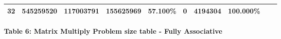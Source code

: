 \documentclass[11pt]{article}
\begin{document}
\begin{longtable}[]{@{}llllllllll@{}}
\begin{minipage}[t]{0.09\columnwidth}
32\strut
\end{minipage} & \begin{minipage}[t]{0.07\columnwidth}\raggedright\strut
545259520\strut
\end{minipage} & \begin{minipage}[t]{0.06\columnwidth}\raggedright\strut
117003791\strut
\end{minipage} & \begin{minipage}[t]{0.07\columnwidth}\raggedright\strut
155625969\strut
\end{minipage} & \begin{minipage}[t]{0.07\columnwidth}\raggedright\strut
57.100\%\strut
\end{minipage} & \begin{minipage}[t]{0.06\columnwidth}\raggedright\strut
0\strut
\end{minipage} & \begin{minipage}[t]{0.07\columnwidth}\raggedright\strut
4194304\strut
\end{minipage} & \begin{minipage}[t]{0.07\columnwidth}\raggedright\strut
100.000\%\strut
\end{minipage}\tabularnewline
\bottomrule
\end{longtable}

\paragraph{Table 6: Matrix Multiply Problem size table - Fully
Associative}\label{table-6-matrix-multiply-problem-size-table---fully-associative}
\end{document}
